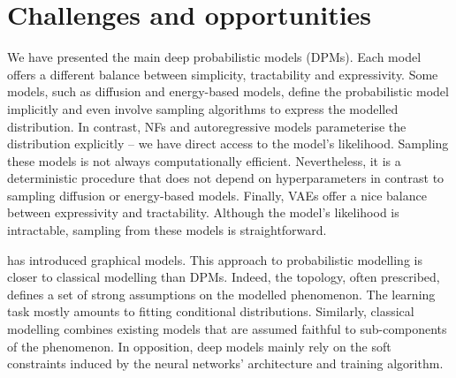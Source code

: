 
\section{Challenges and opportunities}
%
We have presented the main deep probabilistic models (DPMs). Each model offers a different balance between simplicity, tractability and expressivity. Some models, such as diffusion and energy-based models, define the probabilistic model implicitly and even involve sampling algorithms to express the modelled distribution. In contrast,  NFs and autoregressive models parameterise the distribution explicitly -- we have direct access to the model's likelihood. Sampling these models is not always computationally efficient. Nevertheless, it is a deterministic procedure that does not depend on hyperparameters in contrast to sampling diffusion or energy-based models. Finally, VAEs offer a nice balance between expressivity and tractability. Although the model's likelihood is intractable, sampling from these models is straightforward.

 has introduced graphical models. This approach to probabilistic modelling is closer to classical modelling than DPMs. Indeed, the topology, often prescribed, defines a set of strong assumptions on the modelled phenomenon. The learning task mostly amounts to fitting conditional distributions. Similarly, classical modelling combines existing models that are assumed faithful to sub-components of the phenomenon. In opposition, deep models mainly rely on the soft constraints induced by the neural networks' architecture and training algorithm.

